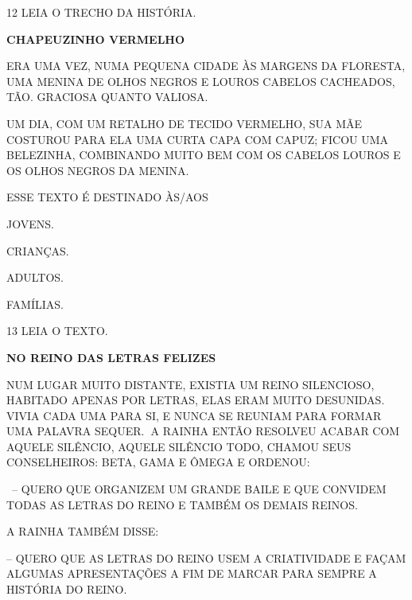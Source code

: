 \num{12} LEIA O TRECHO DA HISTÓRIA.

\textbf{CHAPEUZINHO VERMELHO}

ERA UMA VEZ, NUMA PEQUENA CIDADE ÀS MARGENS DA FLORESTA,
UMA MENINA DE OLHOS NEGROS E LOUROS CABELOS CACHEADOS, TÃO.
GRACIOSA QUANTO VALIOSA.

UM DIA, COM UM RETALHO DE TECIDO VERMELHO, SUA MÃE
COSTUROU PARA ELA UMA CURTA CAPA COM CAPUZ; FICOU UMA
BELEZINHA, COMBINANDO MUITO BEM COM OS CABELOS LOUROS E
OS OLHOS NEGROS DA MENINA.


ESSE TEXTO É DESTINADO ÀS/AOS 

\begin{escolha}
\item JOVENS.

\item CRIANÇAS.

\item ADULTOS.

\item FAMÍLIAS.
\end{escolha}


\num{13} LEIA O TEXTO.

\textbf{NO REINO DAS LETRAS FELIZES}

NUM LUGAR MUITO DISTANTE, EXISTIA UM REINO SILENCIOSO, HABITADO APENAS
POR LETRAS, ELAS ERAM MUITO DESUNIDAS. VIVIA CADA UMA PARA SI, E NUNCA
SE REUNIAM PARA FORMAR UMA PALAVRA SEQUER.\textbf{~}A RAINHA ENTÃO
RESOLVEU ACABAR COM AQUELE SILÊNCIO, AQUELE SILÊNCIO TODO, CHAMOU SEUS
CONSELHEIROS: BETA, GAMA E ÔMEGA E ORDENOU:

~-- QUERO QUE ORGANIZEM UM GRANDE BAILE E QUE CONVIDEM TODAS AS LETRAS
DO REINO E TAMBÉM OS DEMAIS REINOS.

A RAINHA TAMBÉM DISSE:

-- QUERO QUE AS LETRAS DO REINO USEM A CRIATIVIDADE E FAÇAM ALGUMAS
APRESENTAÇÕES A FIM DE MARCAR PARA SEMPRE A HISTÓRIA DO REINO.

